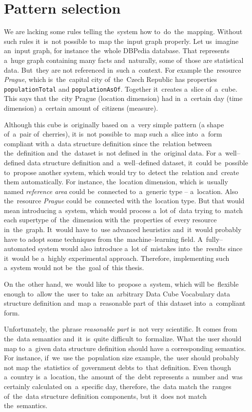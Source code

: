 \section{Pattern selection}
We are lacking some rules telling the~system how to~do~the~mapping. 
Without such rules it~is~not possible to~map the~input graph properly. Let us~imagine an~input graph, for instance the~whole DBPedia database. That represents a~huge graph 
containing many facts and~naturally, some of~those are statistical data. But~they 
are not referenced in~such a~context. For example the~resource \emph{Prague}, which is~the~capital city of~the~Czech Republic has properties \texttt{populationTotal} and
\texttt{populationAsOf}. Together it~creates a~slice of~a~cube. This says that the~city Prague (location dimension) had in~a~certain day (time dimension) 
a~certain amount of~citizens (measure).

Although this cube is~originally based on~a~very simple pattern (a shape of~a~pair of~cherries),
it is~not possible to~map such a~slice into~a~form compliant with a~data structure definition since the~relation between the~definition and~the~dataset is~not defined in~the~original data. For a~well--defined data structure 
definition and~a~well--defined dataset, it~could be~possible to~propose another 
system, which would try to~detect the~relation and~create them 
automatically. For instance, the~location dimension, which is~usually named
\emph{reference area} could be~connected to~a~generic type -- a~location.
Also the~resource \emph{Prague} could be~connected with the~location type. But 
that would mean introducing a~system, which would process a~lot of~data trying to~match each supertype of~the~dimension with the~properties of~every resource in~the~graph. It~would have to~use advanced heuristics and~it~would probably have 
to adopt some techniques from the~machine--learning field. A~fully--automated 
system would also introduce a~lot of~mistakes into~the~results since it~would 
be a~highly experimental approach. Therefore, implementing such a~system would 
not be~the~goal of~this thesis. 

On the~other hand, we~would like to~propose a~system, which will be~flexible 
enough to~allow the~user to~take an~arbitrary Data Cube Vocabulary data 
structure definition and~map a~reasonable part of~this dataset into~a~compliant 
form.

Unfortunately, the~phrase \emph{reasonable part} is~not very scientific. 
It comes from the~data semantics and~it~is~quite difficult to~formalize. What 
the user should map to~a~given data structure definition should have 
a corresponding semantics. For instance, if~we~use the~population size example, the~user should probably not map the~statistics of~government debts to~that 
definition. Even though a~country is~a~location, the~amount of~the~debt represents a~number and~was certainly calculated on~a~specific day, therefore, the~data match the~ranges of~the~data structure definition components, but it~does 
not match the~semantics.

